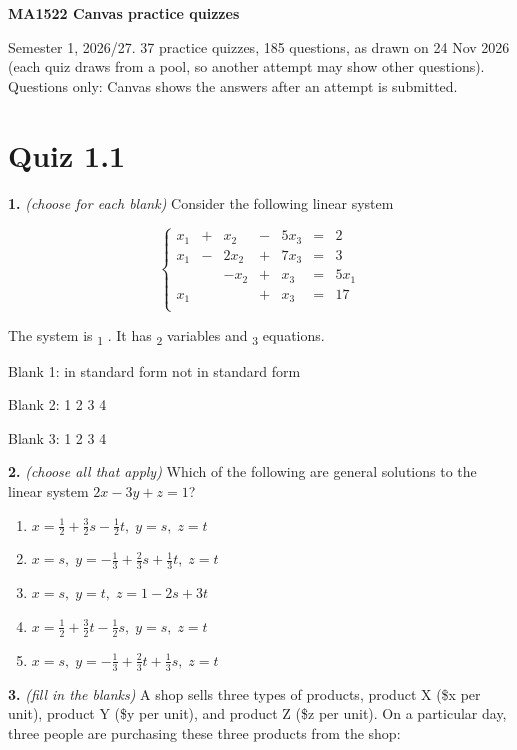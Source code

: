 \documentclass[10pt,a4paper]{article}
\begin{document}
{\LARGE\bfseries MA1522 Canvas practice quizzes}\par
{\small Semester 1, 2026/27. 37 practice quizzes, 185 questions, as drawn on 24 Nov 2026 (each quiz draws from a pool, so another attempt may show other questions). Questions only: Canvas shows the answers after an attempt is submitted.}\par\medskip

\section{Quiz 1.1}
\textbf{1.} \textit{(choose for each blank)} Consider the following linear system

\[\left\{\begin{array}{rrrrrrr}x_1&+&x_2&-&5x_3&=&2\\ x_1&-&2x_2&+&7x_3&=&3\\ &&-x_2&+&x_3&=&5x_1\\ x_1&&&+&x_3&=&17\\ \end{array}\right.\]

The system is  \underline{\hspace{1.2cm}}\textsubscript{1} 
. It has  \underline{\hspace{1.2cm}}\textsubscript{2} 
 variables and  \underline{\hspace{1.2cm}}\textsubscript{3} 
 equations.

\quad Blank 1: in standard form \textbar{} not in standard form

\quad Blank 2: 1 \textbar{} 2 \textbar{} 3 \textbar{} 4

\quad Blank 3: 1 \textbar{} 2 \textbar{} 3 \textbar{} 4

\smallskip
\textbf{2.} \textit{(choose all that apply)} Which of the following are general solutions to the linear system \(2x-3y+z=1\)?

\begin{enumerate}[label=(\Alph*)]
\item \(x=\frac{1}{2}+\frac{3}{2}s-\frac{1}{2}t,\;y=s, \;z=t\)
\item \(x=s,\; y=-\frac{1}{3}+\frac{2}{3}s+\frac{1}{3}t,\; z=t\)
\item \(x=s,\; y=t,\; z=1-2s+3t\)
\item \(x=\frac{1}{2}+\frac{3}{2}t-\frac{1}{2}s, \;y=s,\;z=t\)
\item \(x=s,\; y=-\frac{1}{3}+\frac{2}{3}t+\frac{1}{3}s,\; z=t\)
\end{enumerate}
\smallskip
\textbf{3.} \textit{(fill in the blanks)} A shop sells three types of products, product X (\$x per unit), product Y (\$y per unit), and product Z (\$z per unit). On a particular day, three people are purchasing these three products from the shop:
\end{document}
